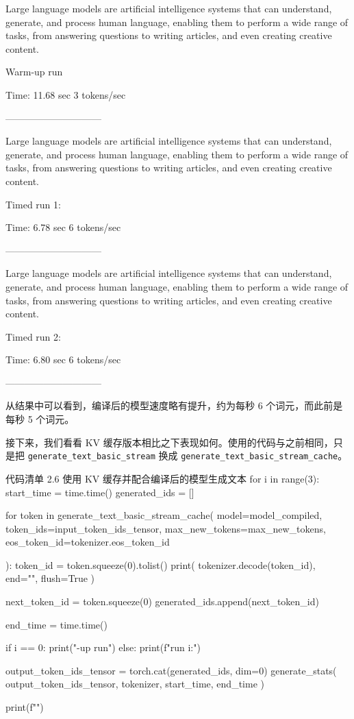 \begin{codebox}
 Large language models are artificial intelligence systems that can
understand, generate, and process human language, enabling them to
perform a wide range of tasks, from answering questions to writing
articles, and even creating creative content.

Warm-up run

Time: 11.68 sec
3 tokens/sec

------------------------------

 Large language models are artificial intelligence systems that can
understand, generate, and process human language, enabling them to
perform a wide range of tasks, from answering questions to writing
articles, and even creating creative content.

Timed run 1:

Time: 6.78 sec
6 tokens/sec

------------------------------

 Large language models are artificial intelligence systems that can
understand, generate, and process human language, enabling them to
perform a wide range of tasks, from answering questions to writing
articles, and even creating creative content.

Timed run 2:

Time: 6.80 sec
6 tokens/sec

------------------------------
\end{codebox}

从结果中可以看到，编译后的模型速度略有提升，约为每秒 6 个词元，而此前是每秒 5 个词元。

接下来，我们看看 KV 缓存版本相比之下表现如何。使用的代码与之前相同，只是把 \texttt{generate\_text\_basic\_stream} 换成 \texttt{generate\_text\_basic\_stream\_cache}。

\begin{codeboxt}{代码清单 2.6 使用 KV 缓存并配合编译后的模型生成文本}
for i in range(3):
    start_time = time.time()
    generated_ids = []

    for token in generate_text_basic_stream_cache(
        model=model_compiled,
        token_ids=input_token_ids_tensor,
        max_new_tokens=max_new_tokens,
        eos_token_id=tokenizer.eos_token_id

    ):
        token_id = token.squeeze(0).tolist()
        print(
            tokenizer.decode(token_id),
            end="",
            flush=True
        )

        next_token_id = token.squeeze(0)
        generated_ids.append(next_token_id)

    end_time = time.time()

    if i == 0:
        print("\n\nWarm-up run")
    else:
        print(f"\n\nTimed run {i}:")

    output_token_ids_tensor = torch.cat(generated_ids, dim=0)
    generate_stats(
        output_token_ids_tensor, tokenizer, start_time, end_time
    )

    print(f"\n")
\end{codeboxt}

